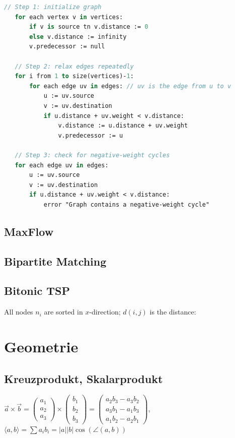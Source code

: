 \documentclass[10pt,a4paper,ngerman,oneside,]{article}
\begin{document}
\begin{multicols}{2}
\begin{lstlisting}[language=pascal]
   // Step 1: initialize graph
   for each vertex v in vertices:
       if v is source tn v.distance := 0
       else v.distance := infinity
       v.predecessor := null

   // Step 2: relax edges repeatedly
   for i from 1 to size(vertices)-1:
       for each edge uv in edges: // uv is the edge from u to v
           u := uv.source
           v := uv.destination
           if u.distance + uv.weight < v.distance:
               v.distance := u.distance + uv.weight
               v.predecessor := u

   // Step 3: check for negative-weight cycles
   for each edge uv in edges:
       u := uv.source
       v := uv.destination
       if u.distance + uv.weight < v.distance:
           error "Graph contains a negative-weight cycle"
\end{lstlisting}
\subsection{MaxFlow}

\subsection{Bipartite Matching}

\hash{--------------------------------}
\subsection{Bitonic TSP}
All nodes $n_i$ are sorted in $x$-direction; $d(i,j)$ is the distance:

\section{Geometrie}
\subsection{Kreuzprodukt, Skalarprodukt}
$\vec{a}\times\vec{b}
  =
  \begin{pmatrix}a_1 \\ a_2 \\ a_3\end{pmatrix}
  \times
  \begin{pmatrix}b_1 \\ b_2 \\ b_3 \end{pmatrix}
  =
  \begin{pmatrix}
    a_2b_3 - a_3b_2 \\
    a_3b_1 - a_1b_3 \\
    a_1b_2 - a_2b_1
  \end{pmatrix}$,~~$\langle a,b\rangle=\sum a_ib_i=|a||b|\cos(\angle(a,b))$

\end{multicols}
\end{document}

